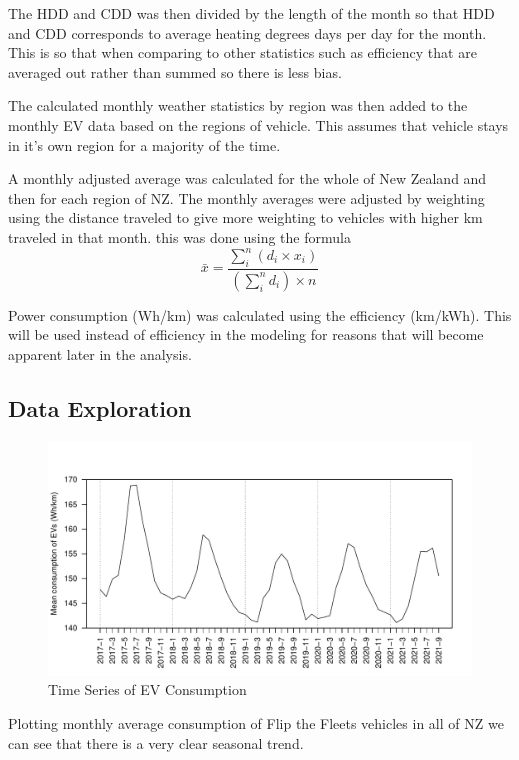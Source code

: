 \documentclass[
]{article}
\begin{document}
The HDD and CDD was then divided by the length of the month so that HDD
and CDD corresponds to average heating degrees days per day for the
month. This is so that when comparing to other statistics such as
efficiency that are averaged out rather than summed so there is less
bias.

The calculated monthly weather statistics by region was then added to
the monthly EV data based on the regions of vehicle. This assumes that
vehicle stays in it's own region for a majority of the time.

A monthly adjusted average was calculated for the whole of New Zealand
and then for each region of NZ. The monthly averages were adjusted by
weighting using the distance traveled to give more weighting to vehicles
with higher km traveled in that month. this was done using the formula
\[\bar{x} = \frac{\sum_{i}^{n} (d_i\times x_i)}{\left(\sum_{i}^{n} d_i\right)\times n}\]

Power consumption (Wh/km) was calculated using the efficiency (km/kWh).
This will be used instead of efficiency in the modeling for reasons that
will become apparent later in the analysis.

\hypertarget{data-exploration}{%
\subsection{Data Exploration}\label{data-exploration}}

\begin{figure}
\centering
\includegraphics{summary_week4_files/figure-latex/eff_plot-1.pdf}
\caption{Time Series of EV Consumption}
\end{figure}

Plotting monthly average consumption of Flip the Fleets vehicles in all
of NZ we can see that there is a very clear seasonal trend.
\end{document}
